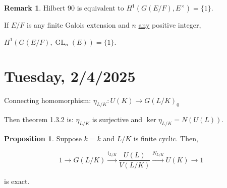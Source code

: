 \documentclass{article}
\theoremstyle{definition}
\numberwithin{theorem}{subsection}
\newtheorem{proposition}[theorem]{Proposition}
\newtheorem*{remark}{Remark}
\begin{document}
    \begin{remark}
        Hilbert 90 is equivalent to \(H^1(G(E / F),E^\times) = \{ 1 \}\).

        If \(E / F\) is any finite Galois extension and \(n\) \underline{any} positive integer,
        
        \(H^1(G(E / F), \operatorname{GL}_n(E)) = \{ 1 \}\). 
    \end{remark}

    \section*{Tuesday, 2/4/2025}
    
    \begin{center}
    \end{center}

    Connecting homomorphism: \(\eta_{L / K}:U(K) \to G(L / K)_0\)

    Then theorem 1.3.2 is: \(\eta_{L / K}\) is surjective and \(\ker \eta_{L / K} = N(U(L))\).

    \begin{proposition}
        Suppose \(k = \overline{k}\) and \(L / K\) is finite cyclic. Then,

        \[
            1 \to G(L / K) \xrightarrow{i_{L / K}} \frac{U(L)}{V(L / K)} \xrightarrow{N_{L / K}} U(K) \to 1 \tag*{$(\ast)$}
        \]

        is exact.
    \end{proposition}
\end{document}
